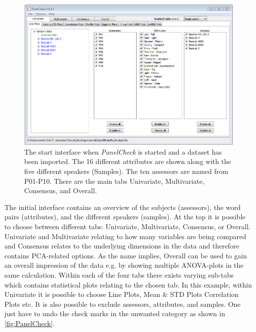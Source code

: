 \begin{figure}
\includegraphics[width = \textwidth]{Figure/PanelCheck.png}
\caption{The start interface when \textit{PanelCheck} is started and a dataset has been imported. The 16 different attributes are shown along with the five different speakers (Samples). The ten assessors are named from P01-P10. There are the main tabs Univariate, Multivariate, Consensus, and Overall.}
\label{fig:PanelCheck}
\end{figure}

The initial interface contains an overview of the subjects (assessors), the word pairs (attributes), and the different speakers (samples). At the top it is possible to choose between different tabs: Univariate, Multivariate, Consensus, or Overall. Univariate and Multivariate relating to how many variables are being compared and Consensus relates to the underlying dimensions in the data and therefore contains PCA-related options. As the name implies, Overall can be used to gain an overall impression of the data e.g. by showing multiple ANOVA-plots in the same calculation. Within each of the four tabs there exists varying sub-tabs which contains statistical plots relating to the chosen tab. In this example, within Univariate it is possible to choose Line Plots, Mean \& STD Plots Correlation Plots etc. It is also possible to exclude assessors, attributes, and samples. One just have to undo the check marks in the unwanted category as shown in \autoref{fig:PanelCheck}.